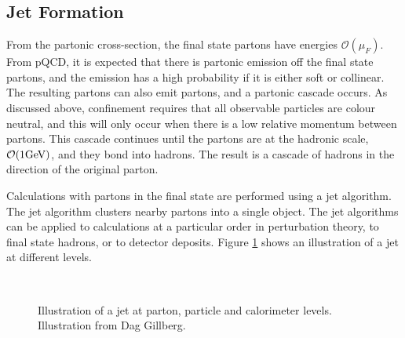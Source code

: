 \subsection{Jet Formation}

From the partonic cross-section, the final state partons have energies $\mathcal{O}(\mu_{F})$.
From pQCD, it is expected that there is partonic emission off the final state partons, and the emission has a high probability if it is either soft or collinear. 
The resulting partons can also emit partons, and a partonic cascade occurs.
As discussed above, confinement requires that all observable particles are colour neutral, and this will only occur when there is a low relative momentum between partons.
This cascade continues until the partons are at the hadronic scale, $\mathcal{O}(1\rm GeV)$, and they bond into hadrons.
The result is a cascade of hadrons in the direction of the original parton.

Calculations with partons in the final state are performed using a jet algorithm.  
The jet algorithm clusters nearby partons into a single object.
The jet algorithms can be applied to calculations at a particular order in perturbation theory, to final state hadrons, or to detector deposits.
Figure \ref{Theory:InitJet} shows an illustration of a jet at different levels.


\begin{figure}
\centering
\mbox{
                              }
\caption[Jets at parton, particle and calorimeter levels]{
Illustration of a jet at parton, particle and calorimeter levels. 
Illustration from Dag Gillberg.
\label{Theory:InitJet}}
\end{figure}

